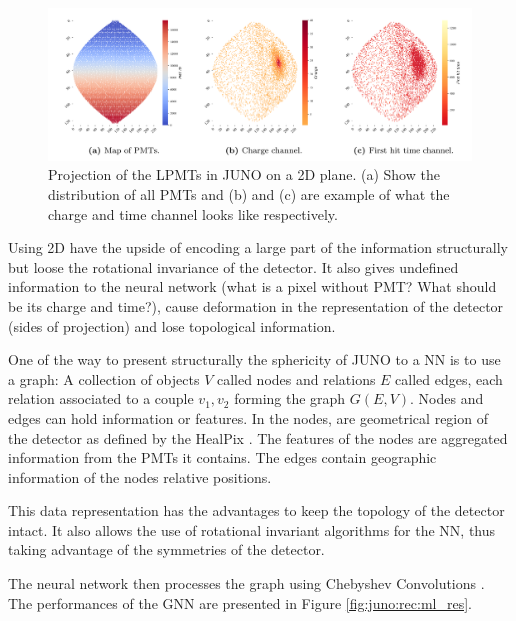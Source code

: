 \documentclass[../main.tex]{subfiles}
\begin{document}
\begin{figure}[ht]
  \centering
  \includegraphics[width=\linewidth]{images/juno/reco/cnn_proj.png}
  \caption{Projection of the LPMTs in JUNO on a 2D plane. (a) Show the distribution of all PMTs and (b) and (c) are example of what the charge and time channel looks like respectively.}
  \label{fig:juno:rec:cnn_proj}
\end{figure}

Using 2D have the upside of encoding a large part of the information structurally but loose the rotational invariance of the detector. It also gives undefined information to the neural network (what is a pixel without PMT? What should be its charge and time?), cause deformation in the representation of the detector (sides of projection) and lose topological information.

One of the way to present structurally the sphericity of JUNO to a NN is to use a graph: A collection of objects $V$ called nodes and relations $E$ called edges, each relation associated to a couple ${v_1, v_2}$ forming the graph $G(E, V)$. Nodes and edges can hold information or features. In \cite{qian_vertex_2021} the nodes, are geometrical region of the detector as defined by the HealPix \cite{gorski_healpix_2005-1}. The features of the nodes are aggregated information from the PMTs it contains. The edges contain geographic information of the nodes relative positions.

This data representation has the advantages to keep the topology of the detector intact. It also allows the use of rotational invariant algorithms for the NN, thus taking advantage of the symmetries of the detector.

The neural network then processes the graph using Chebyshev Convolutions \cite{defferrard_convolutional_2017}. The performances of the GNN are presented in Figure \ref{fig:juno:rec:ml_res}.
\end{document}
